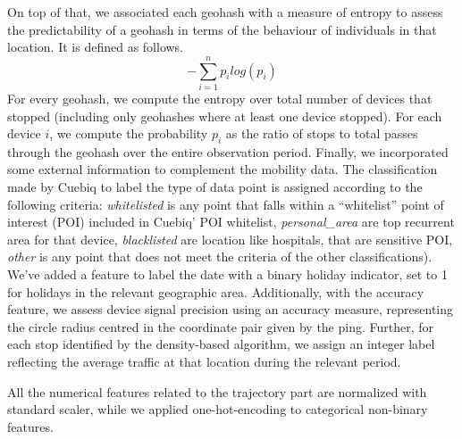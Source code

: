 \documentclass{article}
\begin{document}
On top of that, we associated each geohash with a measure of entropy to assess the predictability of a geohash in terms of the behaviour of individuals in that location. It is defined as follows.
\begin{equation}
    \label{eq:entropy}
    -\sum_{i=1}^n p_i log (p_i)
\end{equation}
For every geohash, we compute the entropy over total number of devices that stopped (including only geohashes where at least one device stopped). For each device $i$, we compute the probability $p_i$ as the ratio of stops to total passes through the geohash over the entire observation period.
Finally, we incorporated some external information to complement the mobility data.
The classification made by Cuebiq to label the type of data point is assigned according to the following criteria: \textit{whitelisted} is any point that falls within a ``whitelist'' point of interest (POI) included in Cuebiq' POI whitelist,  \textit{personal\_area} are top recurrent area for that device, \textit{blacklisted} are location like hospitals, that are sensitive POI, \textit{other} is any point that does not meet the criteria of the other classifications).
We've added a feature to label the date with a binary holiday indicator, set to 1 for holidays in the relevant geographic area. Additionally, with the accuracy feature, we assess device signal precision using an accuracy measure, representing the circle radius centred in the coordinate pair given by the ping.
Further, for each stop identified by the density-based algorithm, we assign an integer label reflecting the average traffic at that location during the relevant period.

All the numerical features related to the trajectory part are normalized with standard scaler, while we applied one-hot-encoding to categorical non-binary features.


\end{document}
